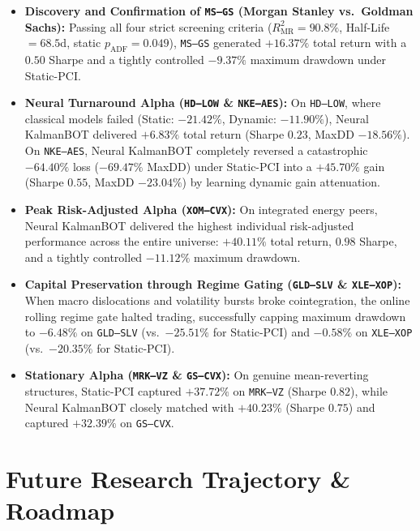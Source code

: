 \documentclass[11pt, a4paper]{article}
\begin{document}
\begin{itemize}
    \item \textbf{Discovery and Confirmation of \texttt{MS--GS} (Morgan Stanley vs.\ Goldman Sachs):} Passing all four strict screening criteria ($R^2_{\text{MR}} = 90.8\%$, Half-Life $= 68.5$d, static $p_{\text{ADF}} = 0.049$), \texttt{MS--GS} generated $\mathbf{+16.37\%}$ total return with a $\mathbf{0.50}$ Sharpe and a tightly controlled $\mathbf{-9.37\%}$ maximum drawdown under Static-PCI.
    \item \textbf{Neural Turnaround Alpha (\texttt{HD--LOW} \& \texttt{NKE--AES}):} On \texttt{HD--LOW}, where classical models failed (Static: $-21.42\%$, Dynamic: $-11.90\%$), Neural KalmanBOT delivered $\mathbf{+6.83\%}$ total return (Sharpe $0.23$, MaxDD $-18.56\%$). On \texttt{NKE--AES}, Neural KalmanBOT completely reversed a catastrophic $-64.40\%$ loss ($-69.47\%$ MaxDD) under Static-PCI into a $\mathbf{+45.70\%}$ gain (Sharpe $0.55$, MaxDD $-23.04\%$) by learning dynamic gain attenuation.
    \item \textbf{Peak Risk-Adjusted Alpha (\texttt{XOM--CVX}):} On integrated energy peers, Neural KalmanBOT delivered the highest individual risk-adjusted performance across the entire universe: $\mathbf{+40.11\%}$ total return, $\mathbf{0.98}$ Sharpe, and a tightly controlled $-11.12\%$ maximum drawdown.
    \item \textbf{Capital Preservation through Regime Gating (\texttt{GLD--SLV} \& \texttt{XLE--XOP}):} When macro dislocations and volatility bursts broke cointegration, the online rolling regime gate halted trading, successfully capping maximum drawdown to $\mathbf{-6.48\%}$ on \texttt{GLD--SLV} (vs.\ $-25.51\%$ for Static-PCI) and $\mathbf{-0.58\%}$ on \texttt{XLE--XOP} (vs.\ $-20.35\%$ for Static-PCI).
    \item \textbf{Stationary Alpha (\texttt{MRK--VZ} \& \texttt{GS--CVX}):} On genuine mean-reverting structures, Static-PCI captured $+37.72\%$ on \texttt{MRK--VZ} (Sharpe $0.82$), while Neural KalmanBOT closely matched with $\mathbf{+40.23\%}$ (Sharpe $0.75$) and captured $\mathbf{+32.39\%}$ on \texttt{GS--CVX}.
\end{itemize}

\section{Future Research Trajectory \& Roadmap}
\end{document}
